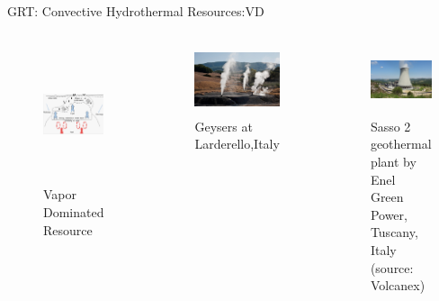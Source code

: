 \begin{frame}{GRT: Convective Hydrothermal Resources:VD\cite{WorldEnergyCouncil2013}}
\begin{columns}
    \begin{figure}
        \centering
        \includegraphics[height=4cm]{images/VDregion.png}
        \caption{\centering \scriptsize Vapor Dominated Resource\cite{lund2015worldwide}}
        \label{fig:vdr}
    \end{figure}
    \begin{figure}
        \centering
        \includegraphics[height=2cm]{images/Lardello Italy.png}
        \caption{\centering \tiny Geysers at Larderello,Italy\cite{PaoloCagnacciPhotography}}
        \label{fig:larderello}
    \end{figure}
    \begin{figure}
        \centering
        \includegraphics[height=2cm]{images/LarderelloGPP.png}
        \caption{\centering \tiny Sasso 2 geothermal plant by Enel Green Power, Tuscany, Italy (source: Volcanex)\cite{LarderelloGPP}}
        \label{fig:larderellogpp}
    \end{figure}
\end{columns}
\end{frame}

